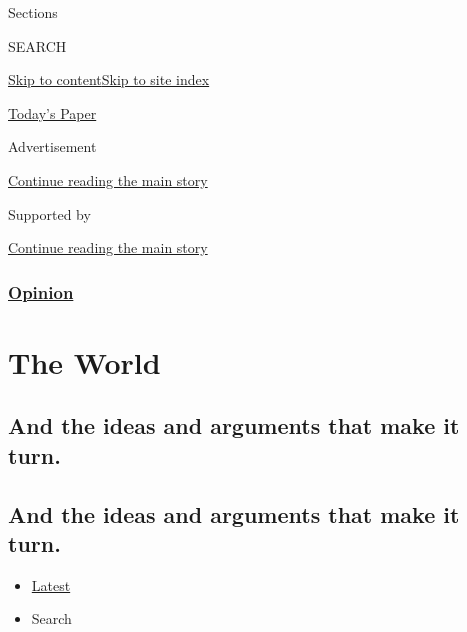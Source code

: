 Sections

SEARCH

\protect\hyperlink{site-content}{Skip to
content}\protect\hyperlink{site-index}{Skip to site index}

\href{https://myaccount.nytimes.com/auth/login?response_type=cookie\&client_id=vi}{}

\href{https://www.nytimes.com/section/todayspaper}{Today's Paper}

Advertisement

\protect\hyperlink{after-top}{Continue reading the main story}

Supported by

\protect\hyperlink{after-sponsor}{Continue reading the main story}

\hypertarget{opinion}{%
\subsubsection{\texorpdfstring{\href{/section/opinion}{Opinion}}{Opinion}}\label{opinion}}

\hypertarget{the-world}{%
\section{The World}\label{the-world}}

\hypertarget{and-the-ideas-and-arguments-that-make-it-turn}{%
\subsection{And the ideas and arguments that make it
turn.}\label{and-the-ideas-and-arguments-that-make-it-turn}}

\hypertarget{and-the-ideas-and-arguments-that-make-it-turn-1}{%
\subsection{And the ideas and arguments that make it
turn.}\label{and-the-ideas-and-arguments-that-make-it-turn-1}}

\begin{itemize}
\tightlist
\item
  \protect\hyperlink{stream-panel}{Latest}
\item
  Search
\end{itemize}

